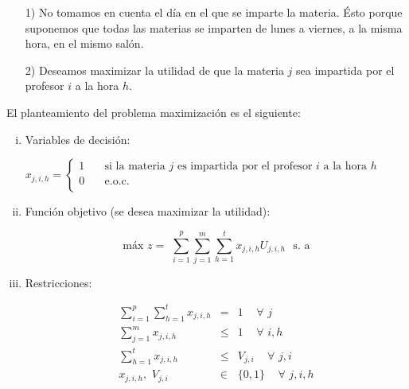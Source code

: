 \begin{enumerate}
\item[1)] No tomamos en cuenta el día en el que se imparte la materia. Ésto porque suponemos que todas las materias se imparten de lunes a viernes, a la misma hora, en el mismo salón.

\item[2)] Deseamos maximizar la utilidad de que la materia $j$ sea impartida por  el profesor $i$ a la hora $h$.
\end{enumerate}

El planteamiento del problema maximización es el siguiente:

\begin{enumerate}[i)]
\item Variables de decisión:
  
  $ x_{j,i,h} =
  \begin{cases}
1  & \quad \text{si la materia } j \text{ es impartida por el profesor  } i \text{ a la hora } h\\
0  & \quad \text{e.o.c. } \\
\end{cases}
$
  
  \item Función objetivo (se desea maximizar la utilidad):

\begin{equation*}
\text{máx} \,\, z =  \,\, \displaystyle \sum_{i=1}^{p} \sum_{j=1}^{m} \sum_{h=1}^{t} x_{j,i,h} U_{j,i,h} \,\,\,\, \text{s. a}
\end{equation*}

\item Restricciones:
  
  \begin{eqnarray}
\displaystyle \sum_{i=1}^{p} \sum_{h=1}^{t} x_{j,i,h} &=& 1  \,\,\,\,\,\,\, \forall \,\, j\label{DarTodasMaterias}\\
\displaystyle \sum_{j=1}^{m} x_{j,i,h} &\leqslant& 1 \,\,\,\,\,\,\, \forall \,\, i,h \label{UnCursoXhora}\\
\displaystyle \sum_{h=1}^{t} x_{j,i,h} &\leqslant& V_{j,i} \,\,\,\,\,\,\, \forall \,\, j,i \label{ProfesorPuedeImpartir}\\
x_{j,i,h}, \,\, V_{j,i} &\in& \{0,1\} \,\,\,\,\,\,\, \forall \,\, j,i,h \label{VarBinarias}
\end{eqnarray}
\end{enumerate}


